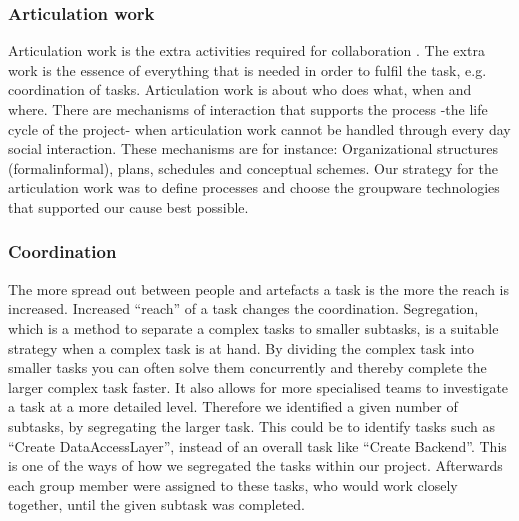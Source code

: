 \subsubsection{Articulation work} \label{subsubsec:articulationwork}
Articulation work is the extra activities required for collaboration \cite{schmidt1992taking}. The extra work is the essence of everything that is needed in order to fulfil the task, e.g. coordination of tasks. Articulation work is about who does what, when and where. There are mechanisms of interaction that supports the process -the life cycle of the project- when articulation work cannot be handled through every day social interaction. These mechanisms are for instance: Organizational structures (formal\/informal), plans, schedules and conceptual schemes. 
Our strategy for the articulation work was to define processes and choose the groupware technologies that supported our cause best possible.

\subsubsection{Coordination} \label{subsubsec:coordination}
The more spread out between people and artefacts a task is the more the reach is increased. Increased ``reach'' of a task changes the coordination. Segregation, which is a method to separate a complex tasks to smaller subtasks, is a suitable strategy when a complex task is at hand. By dividing the complex task into smaller tasks you can often solve them concurrently and thereby complete the larger complex task faster. It also allows for more specialised teams to investigate a task at a more detailed level. Therefore we identified a given number of subtasks, by segregating the larger task. This could be to identify tasks such as ``Create DataAccessLayer'', instead of an overall task like ``Create Backend''. This is one of the ways of how we segregated the tasks within our project. Afterwards each group member were assigned to these tasks, who would work closely together, until the given subtask was completed.


